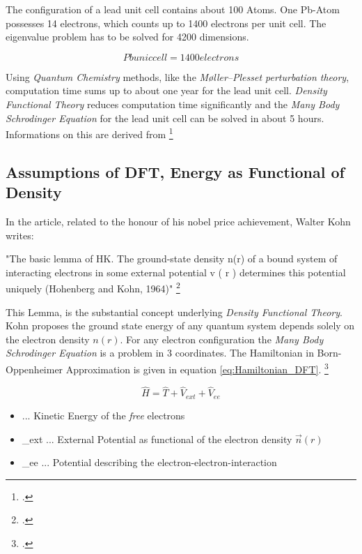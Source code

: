 The configuration of a lead unit cell contains about 100 Atoms. One Pb-Atom possesses 14 electrons, which counts up to 1400 electrons per unit cell. The eigenvalue problem has to be solved for 4200 dimensions. 

\begin{equation}
	Pb unic cell = 1400 electrons
	\label{eq:pb}
\end{equation}


Using \textit{Quantum Chemistry} methods, like the \textit{Møller–Plesset perturbation theory}, computation time sums up to about one year for the lead unit cell. \textit{Density Functional Theory} reduces computation time significantly and the \textit{Many Body Schrodinger Equation} for the lead unit cell can be solved in about 5 hours. Informations on this are derived from \footcite{MITlecture3}


\subsection{Assumptions of DFT, Energy as Functional of Density}
\label{subsection:2.2.2}

In the article, related to the honour of his nobel price achievement, Walter Kohn writes: 

"The basic lemma of HK. The ground-state density n(r) of a bound system of interacting electrons in some external potential v ( r ) determines this potential uniquely (Hohenberg and Kohn, 1964)" \footcite[7]{nobel-kohn}

This Lemma, is the substantial concept underlying \textit{Density Functional Theory}. Kohn proposes the ground state energy of any quantum system depends solely on the electron density $n(r)$. For any electron configuration the \textit{Many Body Schrodinger Equation} is a problem in 3 coordinates. The Hamiltonian in Born-Oppenheimer Approximation is given in equation \ref{eq:Hamiltonian_DFT}. \footcite[6]{dft-hutter}

\begin{equation}
	\hat{H} = \hat{T} + \hat{V}_{ext} + \hat{V}_{ee} 
	\label{eq:Hamiltonian_DFT}
\end{equation}

\begin{itemize}
	\item {} ... Kinetic Energy of the \textit{free} electrons 
	\item  {}_{ext} ... External Potential as functional of the electron density $\vec{n}(r)$
	\item {}_{ee}  ... Potential describing the electron-electron-interaction
\end{itemize}

